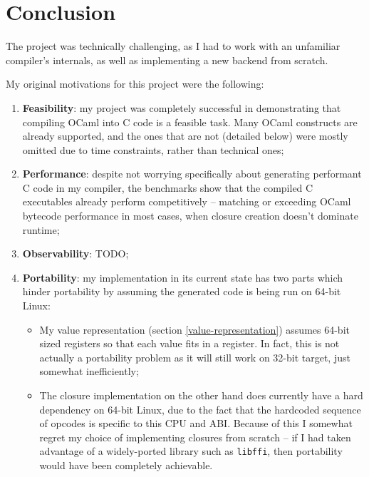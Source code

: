 \documentclass[12pt,a4paper,twoside,openright]{report}
\begin{document}
\chapter{Conclusion}\label{conclusion}

The project was technically challenging, as I had to work with an unfamiliar
compiler's internals, as well as implementing a new backend from scratch.

My original motivations for this project were the following:
\begin{enumerate}
    \item \textbf{Feasibility}: my project was completely successful in
      demonstrating that compiling OCaml into C code is a feasible task. Many
      OCaml constructs are already supported, and the ones that are not
      (detailed below) were mostly omitted due to time constraints, rather than
      technical ones;
    \item \textbf{Performance}: despite not worrying specifically about
      generating performant C code in my compiler, the benchmarks show that
      the compiled C executables already perform competitively -- matching or
      exceeding OCaml bytecode performance in most cases, when closure creation
      doesn't dominate runtime;
    \item \textbf{Observability}: TODO;
    \item \textbf{Portability}: my implementation in its current state has two
      parts which hinder portability by assuming the generated code is being
      run on 64-bit Linux:
      \begin{itemize}
        \item
          My value representation (section \ref{value-representation}) assumes
          64-bit sized registers so that each value fits in a register.
          In fact, this is not actually a portability problem as it will still
          work on 32-bit target, just somewhat inefficiently;
        \item The closure implementation on the other hand does currently have a hard
          dependency on 64-bit Linux, due to the fact that the hardcoded
          sequence of opcodes is specific to this CPU and ABI. Because of this
          I somewhat regret my choice of implementing closures from scratch --
          if I had taken advantage of a widely-ported library such as
          \lstinline!libffi!, then portability would have been completely
          achievable.
      \end{itemize}
\end{enumerate}
\end{document}

